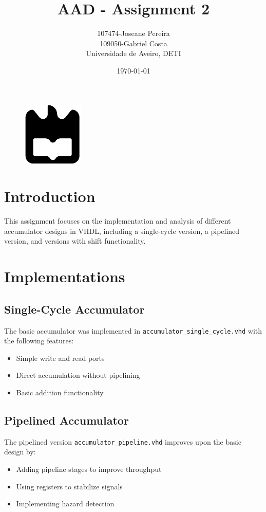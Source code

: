 \documentclass[a4paper,12pt]{article}
\title{AAD - Assignment 2}
\author{107474-Joseane Pereira \\
109050-Gabriel Costa \\
Universidade de Aveiro, DETI}
\date{\today}
\begin{document}
\begin{figure}
    \centering
    \includegraphics[width=0.3\linewidth]{ua.pdf}
    \label{fig:enter-label}
\end{figure}
\maketitle
\newpage
\tableofcontents
\newpage
\section{Introduction}
This assignment focuses on the implementation and analysis of different accumulator designs in VHDL, including a single-cycle version, a pipelined version, and versions with shift functionality.

\section{Implementations}
\subsection{Single-Cycle Accumulator}
The basic accumulator was implemented in \texttt{accumulator\_single\_cycle.vhd} with the following features:
\begin{itemize}
    \item Simple write and read ports
    \item Direct accumulation without pipelining
    \item Basic addition functionality
\end{itemize}

\subsection{Pipelined Accumulator}
The pipelined version \texttt{accumulator\_pipeline.vhd} improves upon the basic design by:
\begin{itemize}
    \item Adding pipeline stages to improve throughput
    \item Using registers to stabilize signals
    \item Implementing hazard detection
\end{itemize}
\end{document}
